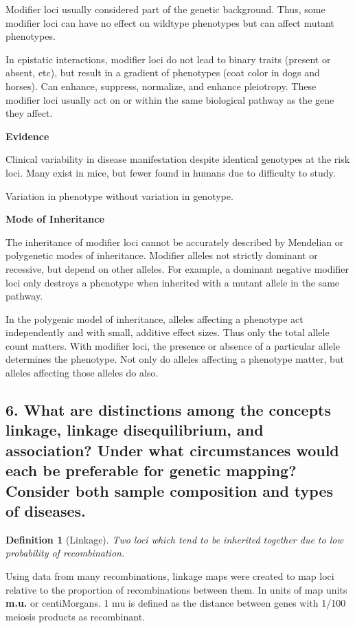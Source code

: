 \documentclass{tufte-handout}
\theoremstyle{noparens}
\newtheorem*{define}{Definition}
\begin{document}
Modifier loci usually considered part of the genetic background. Thus, some modifier loci can have no effect on wildtype phenotypes but can affect mutant phenotypes.

In epistatic interactions, modifier loci do not lead to binary traits (present or absent, etc), but result in a gradient of phenotypes (coat color in dogs and horses). Can enhance, suppress, normalize, and enhance pleiotropy. These modifier loci usually act on or within the same biological pathway as the gene they affect.

\noindent
\textbf{Evidence}

Clinical variability in disease manifestation despite identical genotypes at the risk loci. Many exist in mice, but fewer found in humans due to difficulty to study.

Variation in phenotype without variation in genotype. 

\noindent
\textbf{Mode of Inheritance}

The inheritance of modifier loci cannot be accurately described by Mendelian or polygenetic modes of inheritance. Modifier alleles not strictly dominant or recessive, but depend on other alleles. For example, a dominant negative modifier loci only destroys a phenotype when inherited with a mutant allele in the same pathway.

In the polygenic model of inheritance, alleles affecting a phenotype act independently and with small, additive effect sizes. Thus only the total allele count matters. With modifier loci, the presence or absence of a particular allele determines the phenotype. Not only do alleles affecting a phenotype matter, but alleles affecting those alleles do also.

\newpage
\subsection{6. What are distinctions among the concepts linkage, linkage disequilibrium, and association? Under what circumstances would each be preferable for genetic mapping? Consider both sample composition and types of diseases.}
\label{subsec:06}

\begin{define}[Linkage]
Two loci which tend to be inherited together due to low probability of recombination.
\end{define}

Using data from many recombinations, linkage maps were created to map loci relative to the proportion of recombinations between them. In units of map units \textbf{m.u.} or centiMorgans. 1 mu is defined as the distance between genes with 1/100 meiosis products as recombinant. 
\end{document}
